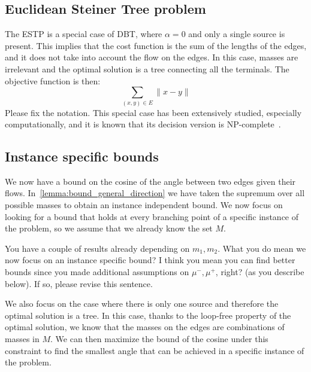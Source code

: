 \documentclass[11pt,reqno,a4paper]{amsart}
\numberwithin{equation}{section}
\theoremstyle{mytheorem}
\theoremstyle{myremark}
\theoremstyle{myparagraph}
\begin{document}
    \subsection{Euclidean Steiner Tree problem}

    The ESTP is a special case of DBT, where  $\alpha=0$ and only a single source is present.
    This implies that the cost function is the sum of the lengths of the edges, and it does not take into account the flow on the edges.
    In this case, masses are irrelevant and the optimal solution is a tree connecting all the terminals.
    The objective function is then:
    \begin{equation}
        \sum_{(x,y) \in E} \|x - y\|
    \end{equation}
    {\color{red} Please fix the notation.}
    This special case has been extensively studied, especially computationally,
    and it is known that its decision version is NP-complete~\cite{karp2010reducibility}.

    \subsection{Instance specific bounds}

    We now have a bound on the cosine of the angle between two edges given their flows. In~\ref{lemma:bound_general_direction} we have
    taken the supremum over all possible masses to obtain an instance independent bound.
    We now focus on looking for a bound that holds at every branching point of a specific instance of the problem,
    so we assume that we already know the set $M$.

        {\color{red} You have a couple of results already depending on $m_1, m_2$. What you do mean we now focus on an instance specific bound?
    I think you mean you can find better bounds since you made additional assumptions on $\mu^-, \mu^+$, right? (as you describe below). If so, please revise this sentence.}

    We also focus on the case where there is only one source and therefore the optimal solution is a tree.
    In this case, thanks to the loop-free property of the optimal solution, we know that the masses on the edges are
    combinations of masses in $M$. We can then maximize the bound of the cosine under this constraint to find the smallest
    angle that can be achieved in a specific instance of the problem.
\end{document}
